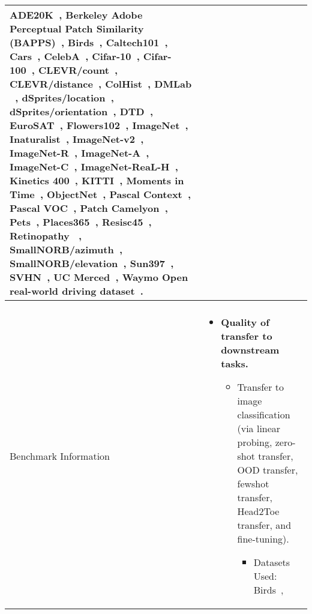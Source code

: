 \documentclass{article}
\begin{document}
{\begin{longtable}[c]{ p{} | p{} }
ADE20K~\citep{zhou2017scene},
Berkeley Adobe Perceptual Patch Similarity (BAPPS)~\citep{zhang2018perceptual},
Birds~\citep{WahCUB_200_2011},
Caltech101~\citep{li_andreeto_ranzato_perona_2022},
Cars~\citep{KrauseStarkDengFei-Fei_3DRR2013},
CelebA~\citep{liu2015faceattributes},
Cifar-10~\citep{krizhevsky2009learning},
Cifar-100~\citep{krizhevsky2009learning},
CLEVR/count~\citep{johnson2017clevr},
CLEVR/distance~\citep{johnson2017clevr},
ColHist~\citep{kather2016multi},
DMLab ~\citep{beattie2016deepmind},
dSprites/location~\citep{dsprites17},
dSprites/orientation~\citep{dsprites17},
DTD~\citep{cimpoi2014describing},
EuroSAT~\citep{helber2019eurosat},
Flowers102~\citep{nilsback2008automated},
ImageNet~\citep{deng2009imagenet},
Inaturalist~\citep{cui2018large},
ImageNet-v2~\citep{recht2019imagenet_v2},
ImageNet-R~\citep{hendrycks2020imagenet_r}, 
ImageNet-A~\citep{hendrycks2021imagenet_a},
ImageNet-C~\citep{hendrycks2019benchmarking},
ImageNet-ReaL-H~\citep{tran2022plex},
Kinetics 400~\citep{kay2017kinetics},
KITTI~\citep{geiger2013vision},
Moments in Time~\citep{monfort2019moments},
ObjectNet~\citep{barbu2019objectnet}, 
Pascal Context~\citep{mottaghi2014role},
Pascal VOC~\citep{everingham2010pascal},
Patch Camelyon~\citep{teh2019metric},
Pets~\citep{parkhi2012cats},
Places365~\citep{zhou2017places},
Resisc45~\citep{cheng2017remote},
Retinopathy ~\citep{kaggle-diabetic-retinopathy},
SmallNORB/azimuth~\citep{lecun2004learning},
SmallNORB/elevation~\citep{lecun2004learning},
Sun397~\citep{xiao2010sun},
SVHN~\citep{netzer2011reading},
UC Merced~\citep{yang2010bag},
Waymo Open real-world driving dataset~\citep{sun2020scalability}.
\\
\hline 
\pagebreak  \toprule
\multicolumn{2}{c}{\textbf{Evaluation Results}}  \\ 
\toprule
\multicolumn{1}{l|}{Benchmark Information} & 
\vspace{-5pt}
\begin{itemize}
    \addtolength{\itemsep}{-1ex}
    \item \textbf{Quality of transfer to downstream tasks.}
    \begin{itemize}
    \addtolength{\itemsep}{-1ex}
    \item Transfer to image classification (via linear probing, zero-shot transfer, OOD transfer, fewshot transfer, Head2Toe transfer, and fine-tuning).
    \begin{itemize}
    \addtolength{\itemsep}{-1ex}
    \item Datasets Used:
            Birds~\citep{WahCUB_200_2011},

\end{itemize}
\end{itemize}
\end{itemize}
\end{longtable}}
\end{document}
